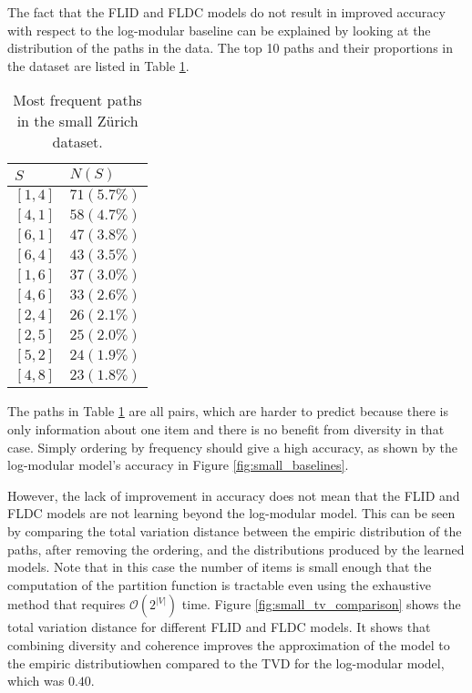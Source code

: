 The fact that the FLID and FLDC models do not result in improved accuracy with respect to the log-modular baseline can be explained by looking at the distribution of the paths in the data. The top 10 paths and their proportions in the dataset are listed in Table \ref{tab:small_top_paths}.

\begin{table}
  \centering
  \caption{Most frequent paths in the small Zürich dataset.}
  \begin{tabular}{@{}ll@{}}
    \toprule
    $S$ & $N(S)$\\
    \midrule
    $[1,4]$ & $71 (5.7\%)$ \\
    $[4,1]$ & $58 (4.7\%)$ \\
    $[6,1]$ & $47 (3.8\%)$ \\
    $[6,4]$ & $43 (3.5\%)$ \\
    $[1,6]$ & $37 (3.0\%)$ \\
    $[4,6]$ & $33 (2.6\%)$ \\
    $[2,4]$ & $26 (2.1\%)$ \\
    $[2,5]$ & $25 (2.0\%)$ \\
    $[5,2]$ & $24 (1.9\%)$ \\
    $[4,8]$ & $23 (1.8\%)$ \\
    \bottomrule
  \end{tabular}
  \label{tab:small_top_paths}
\end{table}

The paths in Table \ref{tab:small_top_paths} are all pairs, which are harder to predict because there is only information about one item and there is no benefit from diversity in that case. Simply ordering by frequency should give a high accuracy, as shown by the log-modular model's accuracy in Figure \ref{fig:small_baselines}.

However, the lack of improvement in accuracy does not mean that the FLID and FLDC models are not learning beyond the log-modular model. This can be seen by comparing the total variation distance between the empiric distribution of the paths, after removing the ordering, and the distributions produced by the learned models. Note that in this case the number of items is small enough that the computation of the partition function is tractable even using the exhaustive method that requires $\mathcal{O}(2^{|V|})$ time. Figure \ref{fig:small_tv_comparison} shows the total variation distance for different FLID and FLDC models. It shows that combining diversity and coherence improves the approximation of the model to the empiric distributiowhen compared to the TVD for the log-modular model, which was $0.40$.

